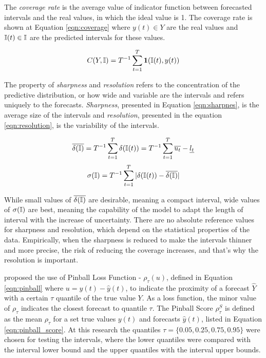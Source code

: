 
The \textit{coverage rate} is the average value of indicator function between forecasted intervals and the real values, in which the ideal value is 1. The coverage rate is shown at Equation \eqref{eqn:coverage} where $y(t) \in Y$ are the real values and $\mathbb{I}(t) \in \mathbb{I}$ are the predicted intervals for these values.

\begin{equation}
C(Y,\mathbb{I}) = T^{-1}\sum_{t = 1 }^T \mathbf{1}(\mathbb{I}(t),y(t))
\label{eqn:coverage}
\end{equation}


The property of \textit{sharpness} and \textit{resolution} refers to the concentration of the predictive distribution, or how wide and variable are the intervals and refers uniquely to the forecasts. \textit{Sharpness}, presented in Equation \eqref{eqn:sharpnes}, is the average size of the intervals and \textit{resolution}, presented in the equation \eqref{eqn:resolution}, is the variability of the intervals.   

\begin{equation}
\overline{\delta(\mathbb{I})} = T^{-1}\sum_{t=1}^{T} \delta(\mathbb{I}(t)) =  T^{-1}\sum_{t=1}^T \overline{u_t} - \underline{l_t}
\label{eqn:sharpnes}
\end{equation}
\begin{equation}
\sigma(\mathbb{I}) = T^{-1}\sum_{t=1}^T | \delta(\mathbb{I}(t)) - \overline{\delta(\mathbb{I})}|
\label{eqn:resolution}
\end{equation}

While small values of $\overline{\delta(\mathbb{I})}$ are desirable, meaning a compact interval, wide values of $\sigma(\mathbb{I})$ are best, meaning the capability of the model to adapt the length of interval with the increase of uncertainty. There are no absolute reference values for sharpness and resolution, which depend on the statistical properties of the data. Empirically, when the sharpness is reduced to make the intervals thinner and more precise, the risk of reducing the coverage increases, and that's why the resolution is important. 


\cite{Steinwart2011} proposed the use of Pinball Loss Function - $\rho_\tau(u)$, defined in Equation \eqref{eqn:pinball} where $u = y(t) - \hat{y}(t)$, to indicate the proximity of a forecast $\hat{Y}$ with a certain $\tau$ quantile of the true value $Y$. As a loss function, the minor value of $\rho_\tau$ indicates the closest forecast to quantile $\tau$. The Pinball Score $\rho_\tau^S$ is defined as the mean $\rho_\tau$ for a set true values $y(t)$ and forecasts $\hat{y}(t)$, listed in Equation \eqref{eqn:pinball_score}. At this research the quantiles $\tau = \{0.05, 0.25, 0.75, 0.95\}$ were chosen for testing the intervals, where the lower quantiles were compared with the interval lower bound and the upper quantiles with the interval upper bounds.

